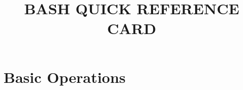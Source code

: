 \def\cmdExample#1#2{
  \noindent
  \hbox to \hsize {%
    \vtop{
      \hbox to 2.2cm {
      \hskip 4pt
      \hfil
      \noindent{\it#1}
      }
    }%
    \hfil	%
    \vtop{
      \hsize=5.90cm
      \hbox{\hfuzz = 15pt \vtop{
      \it{#2}
      }}
    }
  }
  \par
  \vskip 1ex

}%

\def\cmdOpt#1#2{
  \noindent
  \hbox to \hsize {%
    \vtop{
        \hbox to 3.0cm {
      \hfil
      \hfil
      \noindent{#1}
      \hfil
      }
    }%
    \hfil	%
    \vtop{
      \hsize=5.00cm
      \hbox{
          \hfuzz = 15pt
          \vtop{
      {#2}
      }}
    }
  }
  \par
  \vskip 0.14cm

}%

\def\cmdOper#1#2{
  \noindent
  \hbox to \hsize {%
    \vtop{
        \hbox to 1.9cm {
      \hfil
      \hsize=5em
      \noindent{#1}
      \hfil
      }
    }%
    \hfil	%
    \vtop{
      \hsize=5.90cm
      \hbox{\hfuzz = 15pt \vtop{
      {#2}
      }}
    }
  }
  \par
  \vskip 0.14cm

}%



\title{BASH QUICK REFERENCE CARD}

\shortintro

\section{Basic Operations}{}%

